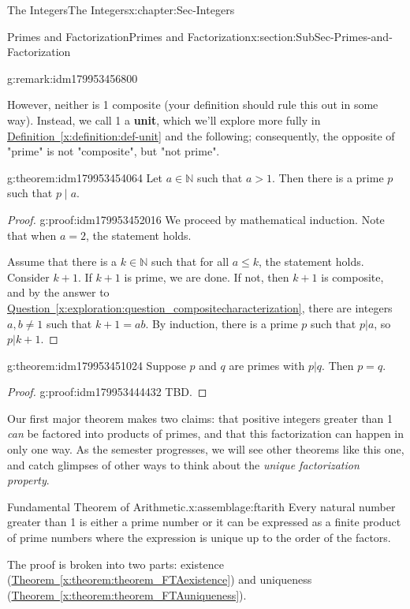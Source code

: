 \documentclass[oneside,10pt,]{book}
\newcommand{\xreffont}{\relax}
\newcommand{\terminology}[1]{\textbf{#1}}
\numberwithin{equation}{section}
\renewcommand{\le}{\leqslant}
\def\N{{\mathbb N}}
\begin{document}
\begin{chapterptx}{The Integers}{}{The Integers}{}{}{x:chapter:Sec-Integers}
\begin{sectionptx}{Primes and Factorization}{}{Primes and Factorization}{}{}{x:section:SubSec-Primes-and-Factorization}
\begin{remark}{}{g:remark:idm179953456800}
\par
However, neither is 1 composite (your definition should rule this out in some way). Instead, we call 1 a \terminology{unit}, which we'll explore more fully in \hyperref[x:definition:def-unit]{Definition~{\xreffont\ref{x:definition:def-unit}}} and the following; consequently, the opposite of "prime" is not "composite", but "not prime".%
\end{remark}
\begin{theorem}{}{}{g:theorem:idm179953454064}%
Let \(a\in \N\) such that \(a > 1\). Then there is a prime \(p\) such that \(p\mid a\).%
\end{theorem}
\begin{proof}{}{g:proof:idm179953452016}
We proceed by mathematical induction. Note that when \(a = 2\), the statement holds.%
\par
Assume that there is a \(k\in\N\) such that for all \(a\le k\), the statement holds. Consider \(k+1\). If \(k+1\) is prime, we are done. If not, then \(k+1\) is composite, and by the answer to \hyperref[x:exploration:question_compositecharacterization]{Question~{\xreffont\ref{x:exploration:question_compositecharacterization}}}, there are integers \(a,b\ne 1\) such that \(k+1 = ab\). By induction, there is a prime \(p\) such that \(p|a\), so \(p|k+1\).%
\end{proof}
\begin{theorem}{}{}{g:theorem:idm179953451024}%
Suppose \(p\) and \(q\) are primes with \(p|q\). Then \(p = q\).%
\end{theorem}
\begin{proof}{}{g:proof:idm179953444432}
TBD.\end{proof}
Our first major theorem makes two claims: that positive integers greater than 1 \emph{can} be factored into products of primes, and that this factorization can happen in only one way. As the semester progresses, we will see other theorems like this one, and catch glimpses of other ways to think about the \emph{unique factorization property}.%
\begin{assemblage}{Fundamental Theorem of Arithmetic.}{x:assemblage:ftarith}%
Every natural number greater than 1 is either a prime number or it can be expressed as a finite product of prime numbers where the expression is unique up to the order of the factors.%
\end{assemblage}
The proof is broken into two parts: existence (\hyperref[x:theorem:theorem_FTAexistence]{Theorem~{\xreffont\ref{x:theorem:theorem_FTAexistence}}}) and uniqueness (\hyperref[x:theorem:theorem_FTAuniqueness]{Theorem~{\xreffont\ref{x:theorem:theorem_FTAuniqueness}}}).%

\end{sectionptx}
\end{chapterptx}
\end{document}
